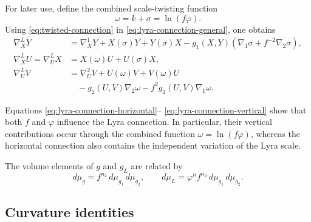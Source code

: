 \documentclass[a4paper,11pt]{article}
\theoremstyle{plain}
\numberwithin{equation}{section}
\begin{document}
For later use, define the combined scale-twisting function
\begin{equation}
	\omega
	=
	k+\sigma
	=
	\ln(f\varphi).
	\label{eq:combined-scale-twisting-function}
\end{equation}
Using \eqref{eq:twisted-connection} in
\eqref{eq:lyra-connection-general}, one obtains
\begin{subequations}
	\label{eq:lyra-connection-components}
	\begin{align}
		\nabla^{L}_{X}Y
		&=
		\nabla^{1}_{X}Y
		+
		X(\sigma)Y
		+
		Y(\sigma)X
		-
		g_{1}(X,Y)
		\left(
		\nabla_{1}\sigma
		+
		f^{-2}\nabla_{2}\sigma
		\right),
		\label{eq:lyra-connection-horizontal}
		\\
		\nabla^{L}_{X}U
		=
		\nabla^{L}_{U}X
		&=
		X(\omega)U
		+
		U(\sigma)X,
		\label{eq:lyra-connection-mixed}
		\\
		\nabla^{L}_{U}V
		&=
		\nabla^{2}_{U}V
		+
		U(\omega)V
		+
		V(\omega)U
		\nonumber\\
		&\quad
		-
		g_{2}(U,V)\nabla_{2}\omega
		-
		f^{2}g_{2}(U,V)\nabla_{1}\omega.
		\label{eq:lyra-connection-vertical}
	\end{align}
\end{subequations}

Equations \eqref{eq:lyra-connection-horizontal}--
\eqref{eq:lyra-connection-vertical} show that both \(f\) and
\(\varphi\) influence the Lyra connection. In particular, their
vertical contributions occur through the combined function
\(\omega=\ln(f\varphi)\), whereas the horizontal connection also
contains the independent variation of the Lyra scale.

The volume elements of \(g\) and \(g_{L}\) are related by
\begin{equation}
	d\mu_{g}
	=
	f^{n_{2}}\,
	d\mu_{g_{1}}\,
	d\mu_{g_{2}},
	\qquad
	d\mu_{L}
	=
	\varphi^{n}f^{n_{2}}\,
	d\mu_{g_{1}}\,
	d\mu_{g_{2}}.
	\label{eq:lyra-volume-element}
\end{equation}

\subsection{Curvature identities}
\label{subsec:curvature-identities}
\end{document}
